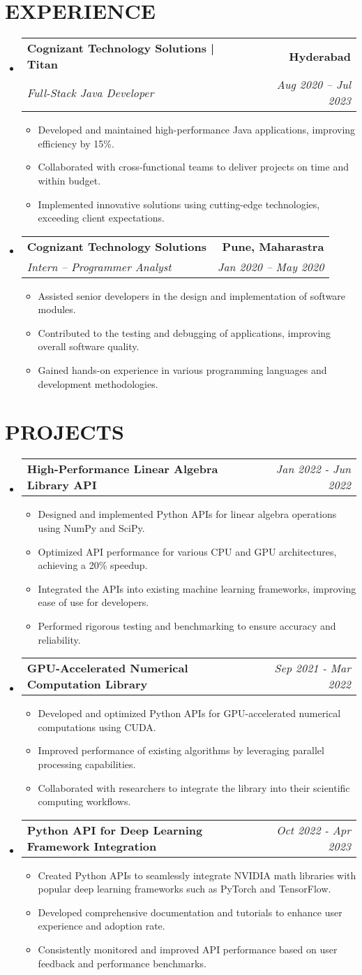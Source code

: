 \documentclass[letterpaper,11pt]{article}
\makeatletter
\newcommand{\resumeItem}[1]{\item\small{{#1 \vspace{-3pt}}}}
\newcommand{\resumeSubheading}[4]{\vspace{-2pt}\item\begin{tabular*}{0.97\textwidth}[t]{l@{\extracolsep{\fill}}r}\textbf{#1} & #2 \\ \textit{\small#3} & \textit{\small #4} \\ \end{tabular*}\vspace{-7pt}}
\newcommand{\resumeProjectHeading}[2]{\item\begin{tabular*}{0.97\textwidth}{l@{\extracolsep{\fill}}r}\small#1 & #2 \\ \end{tabular*}\vspace{-7pt}}
\newcommand{\resumeSubHeadingListStart}{\begin{itemize}[leftmargin=0.15in, label={}]}
\newcommand{\resumeSubHeadingListEnd}{\end{itemize}}
\newcommand{\resumeItemListStart}{\begin{itemize}}
\newcommand{\resumeItemListEnd}{\end{itemize}\vspace{-5pt}}
\makeatother
\begin{document}
\section{{\fontsize{9pt}{20pt}\selectfont \textbf{EXPERIENCE}}}\resumeSubHeadingListStart
\resumeSubheading{Cognizant Technology Solutions | Titan}{\textbf{Hyderabad}}{Full-Stack Java Developer}{Aug 2020 – Jul 2023}
\resumeItemListStart
\resumeItem{Developed and maintained high-performance Java applications, improving efficiency by 15\%.}
\resumeItem{Collaborated with cross-functional teams to deliver projects on time and within budget.}
\resumeItem{Implemented innovative solutions using cutting-edge technologies, exceeding client expectations.}
\resumeItemListEnd
\resumeSubheading{Cognizant Technology Solutions}{\textbf{Pune, Maharastra}}{Intern – Programmer Analyst}{Jan 2020 – May 2020}
\resumeItemListStart
\resumeItem{Assisted senior developers in the design and implementation of software modules.}
\resumeItem{Contributed to the testing and debugging of applications, improving overall software quality.}
\resumeItem{Gained hands-on experience in various programming languages and development methodologies.}
\resumeItemListEnd
\resumeSubHeadingListEnd\vspace{-17pt}
\section{{\fontsize{9pt}{20pt}\selectfont \textbf{PROJECTS}}}\resumeSubHeadingListStart
\resumeProjectHeading{\textbf{High-Performance Linear Algebra Library API}}{\textit{Jan 2022 - Jun 2022}}
\resumeItemListStart
\resumeItem{Designed and implemented Python APIs for linear algebra operations using NumPy and SciPy.}
\resumeItem{Optimized API performance for various CPU and GPU architectures, achieving a 20\% speedup.}
\resumeItem{Integrated the APIs into existing machine learning frameworks, improving ease of use for developers.}
\resumeItem{Performed rigorous testing and benchmarking to ensure accuracy and reliability.}
\resumeItemListEnd\vspace{-6pt}
\resumeProjectHeading{\textbf{GPU-Accelerated Numerical Computation Library}}{\textit{Sep 2021 - Mar 2022}}
\resumeItemListStart
\resumeItem{Developed and optimized Python APIs for GPU-accelerated numerical computations using CUDA.}
\resumeItem{Improved performance of existing algorithms by leveraging parallel processing capabilities.}
\resumeItem{Collaborated with researchers to integrate the library into their scientific computing workflows.}
\resumeItemListEnd\vspace{-6pt}
\resumeProjectHeading{\textbf{Python API for Deep Learning Framework Integration}}{\textit{Oct 2022 - Apr 2023}}
\resumeItemListStart
\resumeItem{Created Python APIs to seamlessly integrate NVIDIA math libraries with popular deep learning frameworks such as PyTorch and TensorFlow.}
\resumeItem{Developed comprehensive documentation and tutorials to enhance user experience and adoption rate.}
\resumeItem{Consistently monitored and improved API performance based on user feedback and performance benchmarks.}
\resumeItemListEnd
\resumeSubHeadingListEnd\vspace{-17pt}
\end{document}
